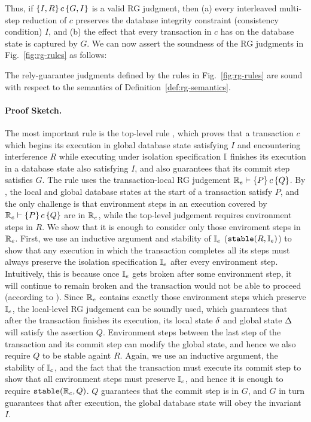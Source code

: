 \noindent Thus, if $\{I,R\}\,c\,\{G,I\}$ is a valid RG judgment, then (a)
every interleaved multi-step reduction of $c$ preserves the database
integrity constraint (consistency condition) $I$, and (b) the effect
that every transaction in $c$ has on the database state is captured by
$G$.
\noindent We can now assert the soundness of the RG judgments in
Fig.~\ref{fig:rg-rules} as follows:

\begin{theorem} 
The rely-guarantee judgments defined by the rules in
Fig.~\ref{fig:rg-rules} are sound with respect to the semantics of
Definition~\ref{def:rg-semantics}.
\end{theorem}


\paragraph{{\sc Proof Sketch.}}  The most important rule is the top-level
rule , which proves that a transaction $c$ which
begins its execution in global database state satisfying $I$ and
encountering interference $R$ while executing under isolation
specification $\mathbb{I}$ finishes its execution in a database state also
satisfying $I$, and also guarantees that its commit step satisfies
$G$. The rule uses the transaction-local RG judgement $\mathbb{R}_e \vdash
\{P\}\,c\,\{Q\}$. By , the local and global
database states at the start of a transaction satisfy $P$, and the
only challenge is that environment steps in an execution covered by
$\mathbb{R}_e \vdash \{P\}\,c\,\{Q\}$ are in $\mathbb{R}_e$, while the top-level
judgement requires environment steps in $R$. We show that it is enough
to consider only those enviroment steps in $\mathbb{R}_e$. First, we use an
inductive argument and stability of $\mathbb{I}_e$ ($\mathtt{stable}(R, \mathbb{I}_e)$) to
show that any execution in which the transaction completes all its
steps must always preserve the isolation specification $\mathbb{I}_e$ after
every environment step. Intuitively, this is because once $\mathbb{I}_e$ gets
broken after some environment step, it will continue to remain broken
and the transaction would not be able to proceed (according to
). Since $\mathbb{R}_e$ contains exactly those environment
steps which preserve $\mathbb{I}_e$, the local-level RG judgement can be
soundly used, which guarantees that after the transaction finishes its
execution, its local state $\delta$ and global state $\Delta$ will satisfy
the assertion $Q$. Environment steps between the last step of the
transaction and its commit step can modify the global state, and hence
we also require $Q$ to be stable againt $R$. Again, we use an
inductive argument, the stability of $\mathbb{I}_c$, and the fact that the
transaction must execute its commit step to show that all environment
steps must preserve $\mathbb{I}_c$, and hence it is enough to require
$\mathtt{stable}(\mathbb{R}_c, Q)$. $Q$ guarantees that the commit step is in $G$, and
$G$ in turn guarantees that after execution, the global database state
will obey the invariant $I$.

